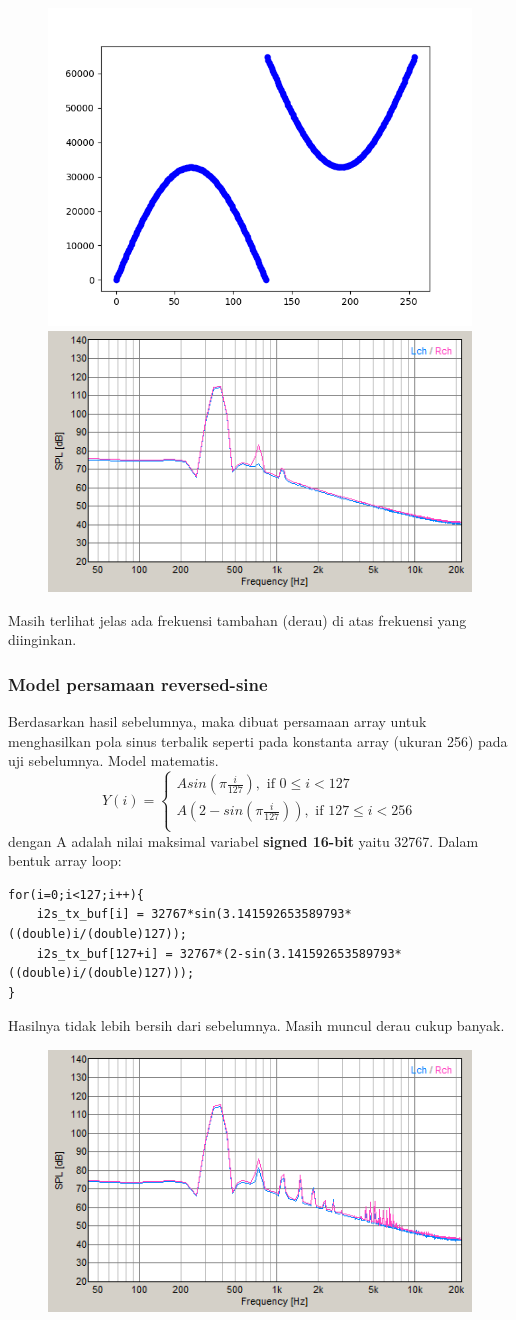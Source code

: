 \documentclass[12pt,]{article}
\begin{document}
	\begin{figure}[H]
		\centering
		\includegraphics[width=0.45\linewidth]{result/day_1/rev_sine_table}
		\includegraphics[width=0.45\linewidth]{result/day_1/tableMax256}
	\end{figure}

	Masih terlihat jelas ada frekuensi tambahan (derau) di atas frekuensi yang diinginkan.     
	
	\subsubsection{Model persamaan reversed-sine}
	Berdasarkan hasil sebelumnya, maka dibuat persamaan array untuk menghasilkan pola sinus terbalik 
	seperti pada konstanta array (ukuran 256) pada uji sebelumnya.
	Model matematis.
	\[
	Y(i) = 
	\begin{cases}
	A sin(\pi \frac{i}{127}), \text{ if } 0 \leq i < 127\\
	A(2-sin(\pi \frac{i}{127})), \text{ if } 127 \leq i < 256\\
	\end{cases}
	 \]
	 dengan A adalah nilai maksimal variabel \textbf{signed 16-bit} yaitu 32767.
	 Dalam bentuk array loop:
	 \begin{verbatim}
for(i=0;i<127;i++){
	i2s_tx_buf[i] = 32767*sin(3.141592653589793*((double)i/(double)127));
	i2s_tx_buf[127+i] = 32767*(2-sin(3.141592653589793*((double)i/(double)127)));
}
	 \end{verbatim}
	 Hasilnya tidak lebih bersih dari sebelumnya. Masih muncul derau cukup banyak.
	 \begin{figure}[H]
	 	\centering
	 	\includegraphics[width=0.45\linewidth]{result/day_1/halfMax256}
	 \end{figure}
 
\end{document}
